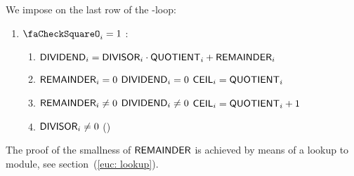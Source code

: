 We impose on the last row of the \ct{}-loop:
\begin{enumerate}
	\item \If $\done_{i}=1$ \Then:
	\begin{enumerate}
		\item \label{euc: result: euclidean division equation} $\textsf{DIVIDEND}_{i} = \textsf{DIVISOR}_{i} \cdot \textsf{QUOTIENT}_{i} + \textsf{REMAINDER}_{i}$
		\item \If $\textsf{REMAINDER}_{i}=0$      \Or $\textsf{DIVIDEND}_{i}=0$      \Then $\textsf{CEIL}_{i} = \textsf{QUOTIENT}_{i}$
		\item \If $\textsf{REMAINDER}_{i} \neq 0$ \et $\textsf{DIVIDEND}_{i} \neq 0$ \Then $\textsf{CEIL}_{i} = \textsf{QUOTIENT}_{i}+1$
		\item $\textsf{DIVISOR}_{i} \neq 0$  \quad (\trash)
	\end{enumerate}
\end{enumerate}
The proof of the smallness of $\textsf{REMAINDER}$ is achieved by means of a lookup to \wcpMod{} module, see section~(\ref{euc: lookup}).
